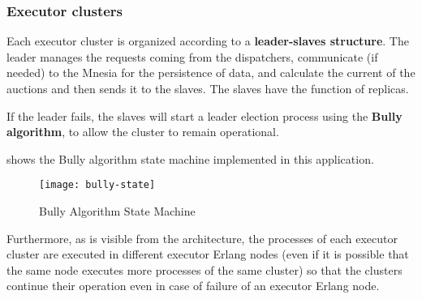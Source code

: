 \subsubsection{Executor clusters}

Each executor cluster is organized according to a \textbf{leader-slaves
structure}. The leader manages the requests coming from the dispatchers,
communicate (if needed) to the Mnesia for the persistence of data, and calculate
the current  of the auctions and then sends it to the slaves.
The slaves have the function of replicas.

If the leader fails, the slaves will start a leader election process using the
\textbf{Bully algorithm}, to allow the cluster to remain operational.

 shows the Bully algorithm state machine implemented in
this application.

\begin{figure}[htb]
	\centering
	\texttt{[image: bully-state]}
	\caption{Bully Algorithm State Machine}\label{fig:bully-state}
\end{figure}

Furthermore, as is visible from the architecture, the processes of each executor
cluster are executed in different executor Erlang nodes (even if it is possible
that the same node executes more processes of the same cluster) so that the
clusters continue their operation even in case of failure of an executor Erlang
node.
